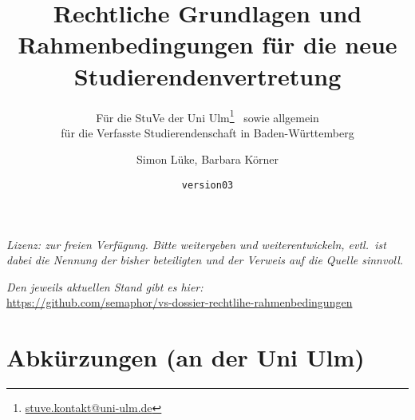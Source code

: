 \documentclass[
10pt,
a4paper,
twoside,								%
titlepage=false,							%
draft=false								%
]{scrartcl}
\begin{document}
\titlehead{\href{http://stuve.uni-ulm.de}{StuVe – StudierendenVertretung, uulm}}


\subject{}

\title{Rechtliche Grundlagen und Rahmenbedingungen für die neue Studierendenvertretung}

\subtitle{Für die StuVe der Uni Ulm\thanks{\href{mailto:stuve.kontakt@uni-ulm.de}{stuve.kontakt@uni-ulm.de}}~ sowie allgemein\\für die Verfasste Studierendenschaft in Baden-Württemberg}

\author{Simon Lüke, Barbara Körner}


\date{\texttt{version03}\\}

\maketitle
\thispagestyle{empty}

\tableofcontents

\vfill

\begin{center}
	\textit{Lizenz: zur freien Verfügung. Bitte weitergeben und weiterentwickeln, evtl.~ist dabei die Nennung der bisher beteiligten und der Verweis auf die Quelle sinnvoll.}

	\textit{Den jeweils aktuellen Stand gibt es hier:\\}
	\url{https://github.com/semaphor/vs-dossier-rechtlihe-rahmenbedingungen}
\end{center}



\newpage
\thispagestyle{empty}

\section*{Abkürzungen (an der Uni Ulm)}

\end{document}
